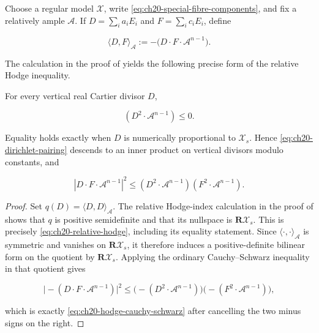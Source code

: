 Choose a regular model $\mathcal X$, write
\eqref{eq:ch20-special-fibre-components}, and fix a relatively ample
$\mathcal A$.  If $D=\sum_i a_iE_i$ and
$F=\sum_i c_iE_i$, define

\begin{equation}
\label{eq:ch20-dirichlet-pairing}
             \langle D,F\rangle_{\mathcal A}
             :=-\bigl(D\cdot F\cdot\mathcal A^{n-1}\bigr).
\end{equation}

The calculation in the proof of  yields the
following precise form of the relative Hodge inequality.

\begin{proposition}\label{prop:ch20-relative-hodge}
For every vertical real Cartier divisor $D$,

\begin{equation}
\label{eq:ch20-relative-hodge}
                    (D^2\cdot\mathcal A^{n-1})\leq0.
\end{equation}

Equality holds exactly when $D$ is numerically proportional to
$\mathcal X_s$.  Hence \eqref{eq:ch20-dirichlet-pairing} descends to an
inner product on vertical divisors modulo constants, and

\begin{equation}
\label{eq:ch20-hodge-cauchy-schwarz}
 |D\cdot F\cdot\mathcal A^{n-1}|^2
 \leq
 (D^2\cdot\mathcal A^{n-1})
 (F^2\cdot\mathcal A^{n-1}).
\end{equation}
\end{proposition}

\begin{proof}
Set $q(D)=\langle D,D\rangle_{\mathcal A}$.  The relative Hodge-index
calculation in the proof of  shows that $q$ is
positive semidefinite and that its nullspace is
$\mathbf R\mathcal X_s$.  This is precisely
\eqref{eq:ch20-relative-hodge}, including its equality statement.  Since
$\langle\cdot,\cdot\rangle_{\mathcal A}$ is symmetric and vanishes on
$\mathbf R\mathcal X_s$, it therefore induces a positive-definite
bilinear form on the quotient by $\mathbf R\mathcal X_s$.  Applying the
ordinary Cauchy--Schwarz inequality in that quotient gives

\[
 \bigl|-(D\cdot F\cdot\mathcal A^{n-1})\bigr|^2
 \leq
 \bigl(-(D^2\cdot\mathcal A^{n-1})\bigr)
 \bigl(-(F^2\cdot\mathcal A^{n-1})\bigr),
\]

which is exactly \eqref{eq:ch20-hodge-cauchy-schwarz} after cancelling the
two minus signs on the right.
\end{proof}

